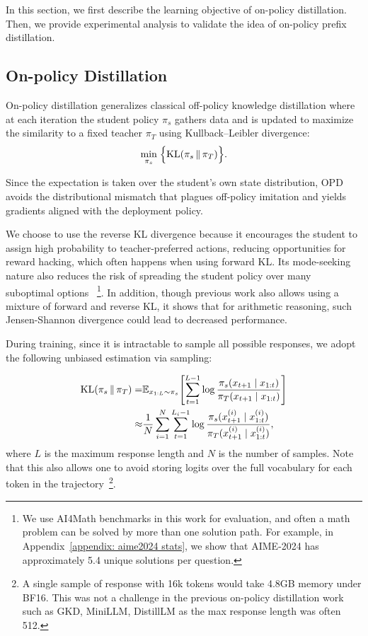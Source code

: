 \documentclass[11pt]{article}
\begin{document}
In this section, we first describe the  learning objective of on-policy distillation. Then, we provide experimental analysis to validate the idea of on-policy prefix distillation. 

\subsection{On-policy Distillation}

On-policy distillation generalizes classical off-policy knowledge distillation where at each iteration the student policy $\pi_s$ gathers data and is updated to maximize the similarity to a fixed teacher $\pi_T$ using Kullback–Leibler divergence: 
$$
\min_{\pi_s}\;\Bigl\{   
\mathrm{KL}(\pi_s\,\|\,\pi_T)
\Bigr\}. 
$$

Since the expectation is taken over the student’s own state distribution, OPD avoids the distributional mismatch that plagues off-policy imitation and yields gradients aligned with the deployment policy.    

We choose to use the reverse KL divergence because it encourages the student to assign high probability to teacher-preferred actions, reducing opportunities for reward hacking, which often happens when using forward KL. Its mode-seeking nature also reduces the risk of spreading the student policy over many suboptimal options \cite{gu2024minillm,he2025nondeterminism}~\footnote{We use AI4Math benchmarks in this work for evaluation, and often a math problem can be solved by more than one solution path. For example, in Appendix~\ref{appendix: aime2024 stats}, we show that AIME-2024 has approximately 5.4 unique solutions per question.}. 
In addition, though previous work \cite{agarwal2024policy} also allows using a mixture of forward and reverse KL, it shows that for arithmetic reasoning, such Jensen-Shannon divergence could lead to decreased performance.

During training, since it is intractable to sample all possible responses, we adopt the following unbiased estimation via sampling:


\begin{align}  
\mathrm{KL}(\pi_s\,\|\,\pi_T)  
= & \mathbb{E}_{x_{1:L}\sim \pi_s}\!\left[  
\sum_{t=1}^{L-1}  
\log \frac{\pi_s(x_{t+1}\mid x_{1:t})}{\pi_T(x_{t+1}\mid x_{1:t})}  
\right] \notag\\  
\approx & \frac{1}{N}\sum_{i=1}^{N}\sum_{t=1}^{L_i-1}   
\log \frac{\pi_s(x^{(i)}_{t+1}\mid x^{(i)}_{1:t})}{\pi_T(x^{(i)}_{t+1}\mid x^{(i)}_{1:t})},  
\label{eq:loss}  
\end{align}  
\noindent where $L$ is the maximum response length and $N$ is the number of samples. Note that this also allows one to avoid storing logits over the full vocabulary for each token in the trajectory~\footnote{A single sample of response with 16k tokens would take 4.8GB memory under BF16. This was not a challenge in the previous on-policy distillation work such as GKD, MiniLLM, DistillLM as the max response length was often 512.}.
\end{document}
